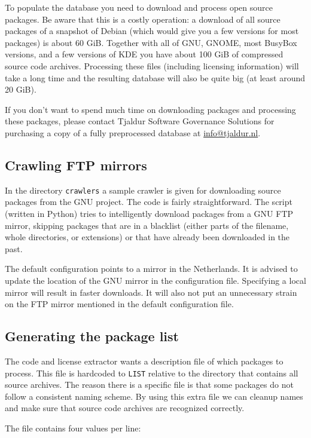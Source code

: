 \documentclass[10pt]{article}
\begin{document}
To populate the database you need to download and process open source packages.
Be aware that this is a costly operation: a download of all source packages of
a snapshot of Debian (which would give you a few versions for most packages) is
about 60 GiB. Together with all of GNU, GNOME, most BusyBox versions, and a few
versions of KDE you have about 100 GiB of compressed source code archives.
Processing these files (including licensing information) will take a long time
and the resulting database will also be quite big (at least around 20 GiB).

If you don't want to spend much time on downloading packages and processing
these packages, please contact Tjaldur Software Governance Solutions for
purchasing a copy of a fully preprocessed database at \url{info@tjaldur.nl}.

\subsection{Crawling FTP mirrors}

In the directory \texttt{crawlers} a sample crawler is given for downloading
source packages from the GNU project. The code is fairly straightforward. The
script (written in Python) tries to intelligently download packages from a GNU
FTP mirror, skipping packages that are in a blacklist (either parts of the
filename, whole directories, or extensions) or that have already been
downloaded in the past.

The default configuration points to a mirror in the Netherlands. It is advised
to update the location of the GNU mirror in the configuration file. Specifying
a local mirror will result in faster downloads. It will also not put an
unnecessary strain on the FTP mirror mentioned in the default configuration
file.

\subsection{Generating the package list}

The code and license extractor wants a description file of which packages to
process. This file is hardcoded to \texttt{LIST} relative to the directory that
contains all source archives. The reason there is a specific file is that some
packages do not follow a consistent naming scheme. By using this extra file we
can cleanup names and make sure that source code archives are recognized
correctly.

The file contains four values per line:
\end{document}
